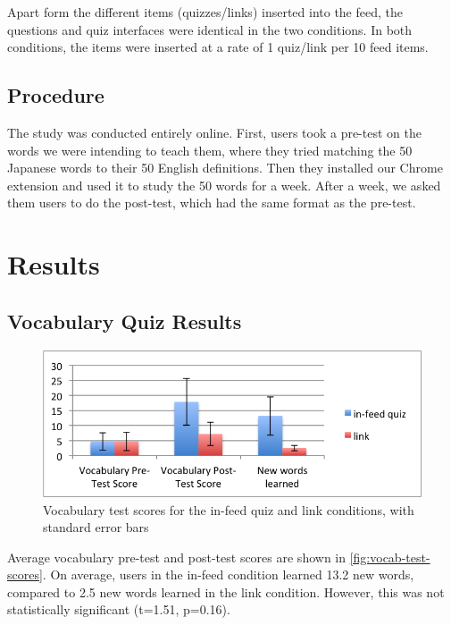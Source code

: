 \documentclass{sigchi}
\begin{document}
Apart form the different items (quizzes/links) inserted into the feed, the questions and quiz interfaces were identical in the two conditions. In both conditions, the items were inserted at a rate of 1 quiz/link per 10 feed items. %


\subsection{Procedure}

The study was conducted entirely online. First, users took a pre-test on the words we were intending to teach them, where they tried matching the 50 Japanese words to their 50 English definitions. Then they installed our Chrome extension and used it to study the 50 words for a week. After a week, we asked them users to do the post-test, which had the same format as the pre-test.

\section{Results}

\subsection{Vocabulary Quiz Results}

\begin{figure}
\centering
\includegraphics[width=1.0\columnwidth]{vocab-test-scores}
\caption{Vocabulary test scores for the in-feed quiz and link conditions, with standard error bars}
\label{fig:vocab-test-scores}
\end{figure}

Average vocabulary pre-test and post-test scores are shown in \autoref{fig:vocab-test-scores}. On average, users in the in-feed condition learned 13.2 new words, compared to 2.5 new words learned in the link condition. However, this was not statistically significant (t=1.51, p=0.16).
\end{document}
